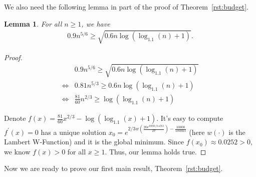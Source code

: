 \documentclass[twoside,11pt]{article}
\newtheorem{lemma}{Lemma}
\begin{document}
We also need the following lemma in part of the proof of Theorem~\ref{rst:budget}.
\begin{lemma}
For all $n\geq 1$, we have
\begin{align}
0.9n^{5/6} \geq \sqrt{0.6n \log(\log_{1.1}(n)+1)}. \nonumber
\end{align}
\label{lemma:cal2}
\end{lemma}
\begin{proof}
\begin{align}
&0.9n^{5/6} \geq \sqrt{0.6n \log(\log_{1.1}(n)+1)} \nonumber \\
\iff & 0.81 n^{5/3} \geq 0.6n \log(\log_{1.1}(n)+1) \nonumber \\
\iff &  \frac{81}{60} n^{2/3} \geq  \log(\log_{1.1}(n)+1) \nonumber
\end{align}

Denote $f(x) = \frac{81}{60}x^{2/3} - \log(\log_{1.1}(x)+1)$. It's easy to compute $f^{'}(x)=0$ has a unique solution $x_{0}=e^{2/3w(\frac{20e^{20000/314763}}{27})-\frac{10000}{104921}}$ (here $w(\cdot)$ is the Lambert W-Function) and it is the global minimum. Since $f(x_{0})\approx 0.0252 >0$, we know $f(x)>0$ for all $x\geq 1$. Thus, our lemma holds true.
\end{proof}


Now we are ready to prove our first main result, Theorem~\ref{rst:budget}.
\end{document}
